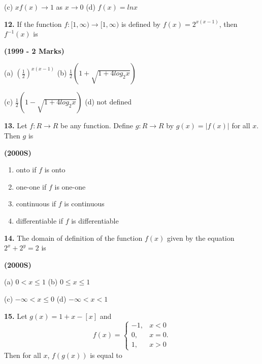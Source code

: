 \documentclass[journal,12pt,twocolumn]{IEEEtran}
\theoremstyle{remark}
\begin{document}
\begin{tabbing}
	(c) $xf(x)\to1$ as $x\to0$ \hspace{.8em} (d) $f(x)=lnx$
\end{tabbing}

\textbf{12.} If the function $f:[1,\infty)\to[1,\infty)$ is defined by $f(x)=2^{x(x-1)}$, then $f^{-1}(x)$ is

\hfill{\textbf{(1999 - 2 Marks)}}

\begin{tabbing}
	(a) $\left(\frac{1}{2}\right)^{x(x-1)}$ \hspace{.8em} (b) $\frac{1}{2}\left(1+\sqrt{1+4log_{2}x}\right)$
\end{tabbing}

\begin{tabbing}
	(c) $\frac{1}{2}\left(1-\sqrt{1+4log_{2}x}\right)$ \hspace{.8em} (d) not defined
\end{tabbing}

\textbf{13.} Let $f:R\to R$ be any function. Define $g:R\to R$ by $g(x)=|f(x)|$ for all $x$. Then $g$ is

\hfill{\textbf{(2000S)}}

\begin{enumerate}
\item[(a)] onto if $f$ is onto
\item[(b)] one-one if $f$ is one-one
\item[(c)] continuous if $f$ is continuous
\item[(d)] differentiable if $f$ is differentiable
\end{enumerate}

\textbf{14.} The domain of definition of the function $f(x)$ given by the equation $2^{x}+2^{y}=2$ is

\hfill{\textbf{(2000S)}}

\begin{tabbing}
	(a) $0<x\le1$ \hspace{.8em} (b) $0\le x\le1$
\end{tabbing}

\begin{tabbing}
	(c) $-\infty<x\le0$ \hspace{.8em} (d) $-\infty<x<1$
\end{tabbing}

\textbf{15.} Let $g(x)=1+x-[x]$ and
\begin{equation}
f(x)=
\begin{cases}
-1, & \text{$x<0$} \\
0, & \text{$x=0$.} \\
1, & \text{$x>0$}
\end{cases}
\end{equation}
Then for all $x$, $f(g(x))$ is equal to
\end{document}
